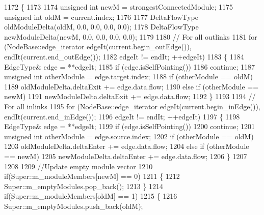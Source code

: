 \begin{DoxyCode}
1172         \{
1173 
1174             \textcolor{keywordtype}{unsigned} \textcolor{keywordtype}{int} newM = strongestConnectedModule;
1175             \textcolor{keywordtype}{unsigned} \textcolor{keywordtype}{int} oldM = current.index;
1176 
1177             DeltaFlowType oldModuleDelta(oldM, 0.0, 0.0, 0.0, 0.0);
1178             DeltaFlowType newModuleDelta(newM, 0.0, 0.0, 0.0, 0.0);
1179 
1180             \textcolor{comment}{// For all outlinks}
1181             \textcolor{keywordflow}{for} (NodeBase::edge\_iterator edgeIt(current.begin\_outEdge()), endIt(current.end\_outEdge());
1182                     edgeIt != endIt; ++edgeIt)
1183             \{
1184                 EdgeType& edge = **edgeIt;
1185                 \textcolor{keywordflow}{if} (edge.isSelfPointing())
1186                     \textcolor{keywordflow}{continue};
1187                 \textcolor{keywordtype}{unsigned} \textcolor{keywordtype}{int} otherModule = edge.target.index;
1188                 \textcolor{keywordflow}{if} (otherModule == oldM)
1189                     oldModuleDelta.deltaExit += edge.data.flow;
1190                 \textcolor{keywordflow}{else} \textcolor{keywordflow}{if} (otherModule == newM)
1191                     newModuleDelta.deltaExit += edge.data.flow;
1192             \}
1193 
1194             \textcolor{comment}{// For all inlinks}
1195             \textcolor{keywordflow}{for} (NodeBase::edge\_iterator edgeIt(current.begin\_inEdge()), endIt(current.end\_inEdge());
1196                     edgeIt != endIt; ++edgeIt)
1197             \{
1198                 EdgeType& edge = **edgeIt;
1199                 \textcolor{keywordflow}{if} (edge.isSelfPointing())
1200                     \textcolor{keywordflow}{continue};
1201                 \textcolor{keywordtype}{unsigned} \textcolor{keywordtype}{int} otherModule = edge.source.index;
1202                 \textcolor{keywordflow}{if} (otherModule == oldM)
1203                     oldModuleDelta.deltaEnter += edge.data.flow;
1204                 \textcolor{keywordflow}{else} \textcolor{keywordflow}{if} (otherModule == newM)
1205                     newModuleDelta.deltaEnter += edge.data.flow;
1206             \}
1207 
1208 
1209             \textcolor{comment}{//Update empty module vector}
1210             \textcolor{keywordflow}{if}(Super::m\_moduleMembers[newM] == 0)
1211             \{
1212                 Super::m\_emptyModules.pop\_back();
1213             \}
1214             \textcolor{keywordflow}{if}(Super::m\_moduleMembers[oldM] == 1)
1215             \{
1216                 Super::m\_emptyModules.push\_back(oldM);

\end{DoxyCode}
